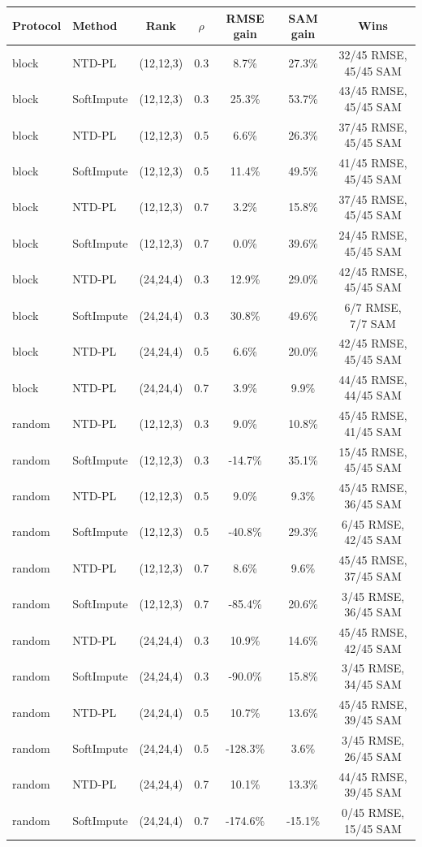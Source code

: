 \begin{tabular}{@{}l l c c c c c@{}}
\toprule
Protocol & Method & Rank & $\rho$ & RMSE gain & SAM gain & Wins\\
\midrule
block & NTD-PL & (12,12,3) & 0.3 & 8.7\% & 27.3\% & 32/45 RMSE, 45/45 SAM\\
block & SoftImpute & (12,12,3) & 0.3 & 25.3\% & 53.7\% & 43/45 RMSE, 45/45 SAM\\
block & NTD-PL & (12,12,3) & 0.5 & 6.6\% & 26.3\% & 37/45 RMSE, 45/45 SAM\\
block & SoftImpute & (12,12,3) & 0.5 & 11.4\% & 49.5\% & 41/45 RMSE, 45/45 SAM\\
block & NTD-PL & (12,12,3) & 0.7 & 3.2\% & 15.8\% & 37/45 RMSE, 45/45 SAM\\
block & SoftImpute & (12,12,3) & 0.7 & 0.0\% & 39.6\% & 24/45 RMSE, 45/45 SAM\\
block & NTD-PL & (24,24,4) & 0.3 & 12.9\% & 29.0\% & 42/45 RMSE, 45/45 SAM\\
block & SoftImpute & (24,24,4) & 0.3 & 30.8\% & 49.6\% & 6/7 RMSE, 7/7 SAM\\
block & NTD-PL & (24,24,4) & 0.5 & 6.6\% & 20.0\% & 42/45 RMSE, 45/45 SAM\\
block & NTD-PL & (24,24,4) & 0.7 & 3.9\% & 9.9\% & 44/45 RMSE, 44/45 SAM\\
random & NTD-PL & (12,12,3) & 0.3 & 9.0\% & 10.8\% & 45/45 RMSE, 41/45 SAM\\
random & SoftImpute & (12,12,3) & 0.3 & -14.7\% & 35.1\% & 15/45 RMSE, 45/45 SAM\\
random & NTD-PL & (12,12,3) & 0.5 & 9.0\% & 9.3\% & 45/45 RMSE, 36/45 SAM\\
random & SoftImpute & (12,12,3) & 0.5 & -40.8\% & 29.3\% & 6/45 RMSE, 42/45 SAM\\
random & NTD-PL & (12,12,3) & 0.7 & 8.6\% & 9.6\% & 45/45 RMSE, 37/45 SAM\\
random & SoftImpute & (12,12,3) & 0.7 & -85.4\% & 20.6\% & 3/45 RMSE, 36/45 SAM\\
random & NTD-PL & (24,24,4) & 0.3 & 10.9\% & 14.6\% & 45/45 RMSE, 42/45 SAM\\
random & SoftImpute & (24,24,4) & 0.3 & -90.0\% & 15.8\% & 3/45 RMSE, 34/45 SAM\\
random & NTD-PL & (24,24,4) & 0.5 & 10.7\% & 13.6\% & 45/45 RMSE, 39/45 SAM\\
random & SoftImpute & (24,24,4) & 0.5 & -128.3\% & 3.6\% & 3/45 RMSE, 26/45 SAM\\
random & NTD-PL & (24,24,4) & 0.7 & 10.1\% & 13.3\% & 44/45 RMSE, 39/45 SAM\\
random & SoftImpute & (24,24,4) & 0.7 & -174.6\% & -15.1\% & 0/45 RMSE, 15/45 SAM\\
\bottomrule
\end{tabular}
